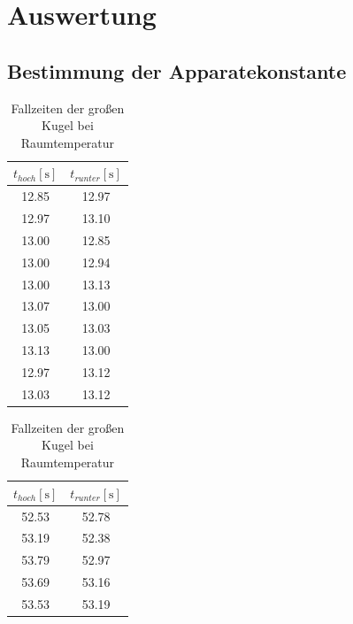 \section{Auswertung}
\label{sec:Auswertung}


\subsection{Bestimmung der Apparatekonstante}
\begin{table}[H]
  \begin{minipage}{0.5\linewidth}
    \centering
    \begin{tabular}{c|c}
      \toprule
      {$t_{hoch}\left[\unit{\s}\right]$} & {$t_{runter}\left[\unit{\s}\right]$}\\
      \midrule
      12.85 & 12.97\\
      12.97 & 13.10\\
      13.00 & 12.85\\
      13.00 & 12.94\\
      13.00 & 13.13\\
      13.07 & 13.00\\
      13.05 & 13.03\\
      13.13 & 13.00\\
      12.97 & 13.12\\
      13.03 & 13.12\\
      \bottomrule
    \end{tabular}
    \vspace{5pt}
    \caption{Fallzeiten der kleinen\\ Kugel bei Raumtemperatur}
    \label{table:kk}
  \end{minipage}
  \begin{minipage}{0.5\linewidth}
    \centering
    \begin{tabular}{c|c}
      \toprule
      {$t_{hoch}\left[\unit{\s}\right]$} & {$t_{runter}\left[\unit{\s}\right]$}\\
      \midrule
      52.53 & 52.78\\
      53.19 & 52.38\\
      53.79 & 52.97\\
      53.69 & 53.16\\
      53.53 & 53.19\\
      \bottomrule
    \end{tabular}
    \vspace{5pt}
    \caption{Fallzeiten der großen\\ Kugel bei Raumtemperatur}
    \label{table:gk}
  \end{minipage}
\end{table}

